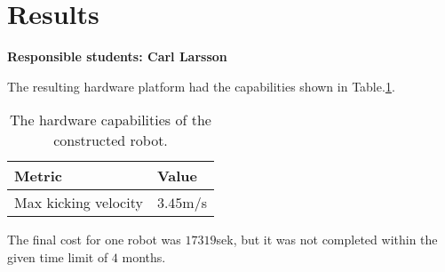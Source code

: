 \section{Results}
\label{section_results}


\textbf{Responsible students: Carl Larsson}


The resulting hardware platform had the capabilities shown in Table.\:\ref{tab:hardware_capabilities}.
\begin{table}[H]
    \centering
    \caption{The hardware capabilities of the constructed robot.}
    \label{tab:hardware_capabilities}
    \begin{tabularx}{\textwidth}{|X|X|} \hline
         \rowcolor{light_grey} \textbf{Metric} & \textbf{Value} \\ \hline
         Max kicking velocity & $3.45$\:\ac{m/s} \\ \hline
    \end{tabularx}
\end{table}
The final cost for one robot was $17319$\:\ac{sek}, but it was not completed within the given time limit of $4$ months.




\begin{comment}
Here you can present, for example, the results of experiments, proofs, analysis of data, etc. Your results must be described clearly enough for a reader to be able to judge them.  You should also explain and analyse the results.
\end{comment}

